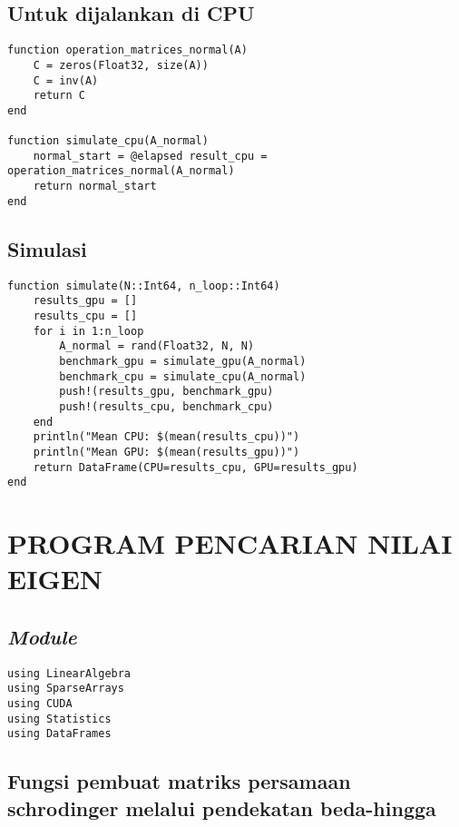 \section{Untuk dijalankan di CPU}

\begin{lstlisting}
function operation_matrices_normal(A)
    C = zeros(Float32, size(A))
    C = inv(A)
    return C
end

function simulate_cpu(A_normal)
    normal_start = @elapsed result_cpu = operation_matrices_normal(A_normal)
    return normal_start
end
\end{lstlisting}

\section{Simulasi}

\begin{lstlisting}
function simulate(N::Int64, n_loop::Int64)
    results_gpu = []
    results_cpu = []
    for i in 1:n_loop
        A_normal = rand(Float32, N, N)
        benchmark_gpu = simulate_gpu(A_normal)
        benchmark_cpu = simulate_cpu(A_normal)
        push!(results_gpu, benchmark_gpu)
        push!(results_cpu, benchmark_cpu)
    end
    println("Mean CPU: $(mean(results_cpu))")
    println("Mean GPU: $(mean(results_gpu))")
    return DataFrame(CPU=results_cpu, GPU=results_gpu)
end
\end{lstlisting}

\chapter{PROGRAM PENCARIAN NILAI EIGEN}
\label{appx:eigenvalue}

\section{\emph{Module}}

\begin{lstlisting}
using LinearAlgebra
using SparseArrays
using CUDA
using Statistics
using DataFrames
\end{lstlisting}

\section{Fungsi pembuat matriks persamaan schrodinger melalui pendekatan beda-hingga}


